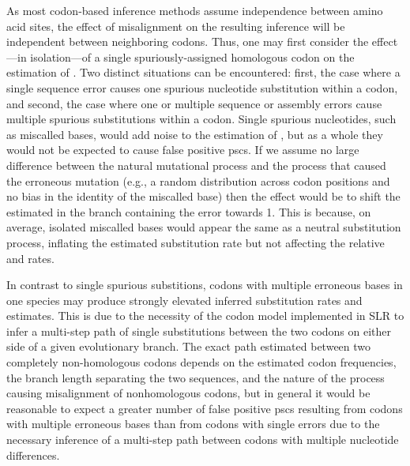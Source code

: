 As most codon-based inference methods assume independence between
amino acid sites, the effect of misalignment on the resulting
inference will be independent between neighboring codons. Thus, one
may first consider the effect---in isolation---of a single
spuriously-assigned homologous codon on the \ml estimation of
\omg. Two distinct situations can be encountered: first, the case
where a single sequence error causes one spurious nucleotide
substitution within a codon, and second, the case where one or
multiple sequence or assembly errors cause multiple spurious
substitutions within a codon. Single spurious nucleotides, such as
miscalled bases, would add noise to the estimation of \omg, but as a
whole they would not be expected to cause false positive \acp{psc}. If
we assume no large difference between the natural mutational process
and the process that caused the erroneous mutation (e.g., a random
distribution across codon positions and no bias in the identity of the
miscalled base) then the effect would be to shift the estimated \omg
in the branch containing the error towards 1. This is because, on
average, isolated miscalled bases would appear the same as a neutral
substitution process, inflating the estimated substitution rate but
not affecting the relative \nsyn and \syn rates.

In contrast to single spurious substitions, codons with multiple
erroneous bases in one species may produce strongly elevated inferred
substitution rates and \omg estimates. This is due to the necessity of
the codon model implemented in SLR to infer a multi-step path of
single substitutions between the two codons on either side of a given
evolutionary branch. The exact \ml path estimated between two
completely non-homologous codons depends on the estimated codon
frequencies, the branch length separating the two sequences, and the
nature of the process causing misalignment of nonhomologous codons,
but in general it would be reasonable to expect a greater number of
false positive \acp{psc} resulting from codons with multiple erroneous
bases than from codons with single errors due to the necessary
inference of a multi-step path between codons with multiple nucleotide
differences.

